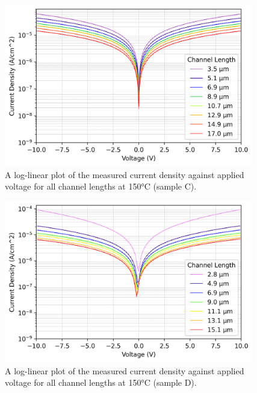 \begin{figure}[h]
    \centering
    \includegraphics[width=0.97\textwidth]{Sample C 2019/10V_Current_Density_vs_Voltage_Temperature_250_log.png}
    \caption{A log-linear plot of the measured current density against applied voltage for all channel lengths at 150\si{\degreeCelsius} (sample C).}
    \label{fig:10V_current_density_150_C}
\end{figure}
\begin{figure}[h]
    \centering
    \includegraphics[width=0.97\textwidth]{Sample D 2019/10V_Current_Density_vs_Voltage_Temperature_250_log.png}
    \caption{A log-linear plot of the measured current density against applied voltage for all channel lengths at 150\si{\degreeCelsius} (sample D).}
    \label{fig:10V__B_current_density_150_D}
\end{figure}

